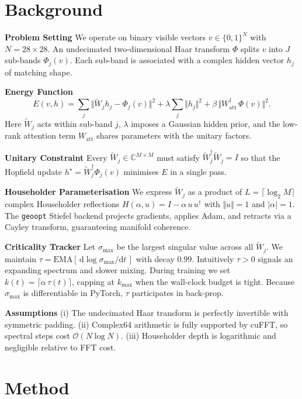 \documentclass{article} %
\begin{document}
\section{Background}
\label{sec:background}
\textbf{Problem Setting}\; We operate on binary visible vectors $v\in\{0,1\}^{N}$ with $N=28\times28$. An undecimated two-dimensional Haar transform $\Phi$ splits $v$ into $J$ sub-bands $\Phi_{j}(v)$. Each sub-band is associated with a complex hidden vector $h_{j}$ of matching shape.

\textbf{Energy Function}
\[
E(v,h)=\sum_{j}\Vert \widetilde W_{j}h_{j}-\Phi_{j}(v)\Vert^{2}+\lambda\sum_{j}\Vert h_{j}\Vert^{2}+\beta\,\Vert W_{\text{att}}^{\dagger}\,\Phi(v)\Vert^{2}.
\]
Here $\widetilde W_{j}$ acts within sub-band $j$, $\lambda$ imposes a Gaussian hidden prior, and the low-rank attention term $W_{\text{att}}$ shares parameters with the unitary factors.

\textbf{Unitary Constraint}\; Every $\widetilde W_{j}\in\mathbb C^{M\times M}$ must satisfy $\widetilde W_{j}^{\dagger}\widetilde W_{j}=I$ so that the Hopfield update $h^{\star}=\widetilde W_{j}^{\dagger}\Phi_{j}(v)$ minimises $E$ in a single pass.

\textbf{Householder Parameterisation}\; We express $\widetilde W_{j}$ as a product of $L=\lceil\log_{2}M\rceil$ complex Householder reflections $H(\alpha,u)=I-\alpha\,u\,u^{\dagger}$ with $\Vert u\Vert=1$ and $|\alpha|=1$. The \texttt{geoopt} Stiefel backend projects gradients, applies Adam, and retracts via a Cayley transform, guaranteeing manifold coherence.

\textbf{Criticality Tracker}\; Let $\sigma_{\max}$ be the largest singular value across all $\widetilde W_{j}$. We maintain $\tau=\text{EMA}[\,\mathrm d\log\sigma_{\max}/\mathrm dt\,]$ with decay $0.99$. Intuitively $\tau>0$ signals an expanding spectrum and slower mixing. During training we set $k(t)=\lceil\alpha\,\tau(t)\rceil$, capping at $k_{\max}$ when the wall-clock budget is tight. Because $\sigma_{\max}$ is differentiable in PyTorch, $\tau$ participates in back-prop.

\textbf{Assumptions}\; (i) The undecimated Haar transform is perfectly invertible with symmetric padding. (ii) Complex64 arithmetic is fully supported by cuFFT, so spectral steps cost $\mathcal{O}(N\log N)$. (iii) Householder depth is logarithmic and negligible relative to FFT cost.

\section{Method}
\label{sec:method}
\end{document}
